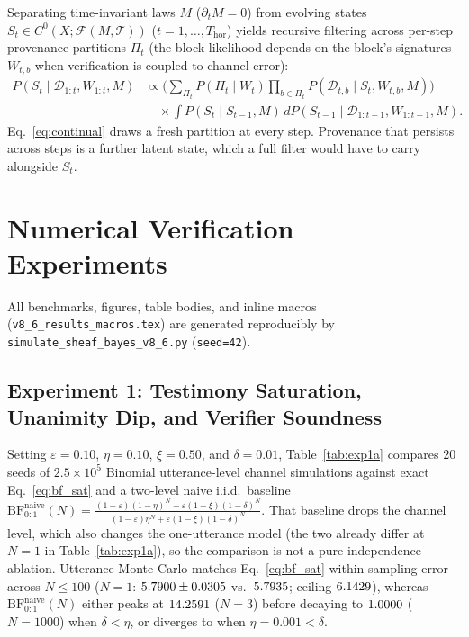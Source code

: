 \documentclass[11pt,a4paper]{article}
\theoremstyle{definition}
\theoremstyle{remark}
\newcommand{\BF}{\mathrm{BF}}
\begin{document}
Separating time-invariant laws $M$ ($\partial_t M = 0$) from evolving states $S_t \in C^0(X;\mathcal{F}(M, \mathcal{T}))$ ($t = 1, \dots, T_{\mathrm{hor}}$) \cite{lopezpaz2026against,pezeshki2024discovering} yields recursive filtering across per-step provenance partitions $\Pi_t$ (the block likelihood depends on the block's signatures $W_{t,b}$ when verification is coupled to channel error):
\begin{equation}
  \begin{aligned}
    P(S_t \mid \mathcal{D}_{1:t}, W_{1:t}, M)
    &\propto \Bigg( \sum_{\Pi_t} P(\Pi_t \mid W_t) \prod_{b \in \Pi_t} P(\mathcal{D}_{t,b} \mid S_t, W_{t,b}, M) \Bigg) \\
    &\quad \times \int P(S_t \mid S_{t-1}, M) \, dP(S_{t-1} \mid \mathcal{D}_{1:t-1}, W_{1:t-1}, M).
  \end{aligned}
  \label{eq:continual}
\end{equation}
Eq.~\eqref{eq:continual} draws a fresh partition at every step. Provenance that persists across steps is a further latent state, which a full filter would have to carry alongside $S_t$.

\section{Numerical Verification Experiments}
\label{sec:experiments}

All benchmarks, figures, table bodies, and inline macros (\texttt{v8\_6\_results\_macros.tex}) are generated reproducibly by \texttt{simulate\_sheaf\_bayes\_v8\_6.py} (\texttt{seed=42}).

\subsection{Experiment 1: Testimony Saturation, Unanimity Dip, and Verifier Soundness}
\label{sec:exp1}

Setting $\varepsilon = 0.10$, $\eta = 0.10$, $\xi = 0.50$, and $\delta = 0.01$, Table~\ref{tab:exp1a} compares $20$ seeds of $2.5 \times 10^5$ Binomial utterance-level channel simulations against exact Eq.~\eqref{eq:bf_sat} and a two-level naive i.i.d.\ baseline $\BF_{0:1}^{\mathrm{naive}}(N) = \frac{(1-\varepsilon)(1-\eta)^N + \varepsilon(1-\xi)(1-\delta)^N}{(1-\varepsilon)\eta^N + \varepsilon(1-\xi)(1-\delta)^N}$. That baseline drops the channel level, which also changes the one-utterance model (the two already differ at $N = 1$ in Table~\ref{tab:exp1a}), so the comparison is not a pure independence ablation. Utterance Monte Carlo matches Eq.~\eqref{eq:bf_sat} within sampling error across $N \le 100$ ($N=1$: $5.7900 \pm 0.0305$ vs.\ $5.7935$; ceiling $6.1429$), whereas $\BF_{0:1}^{\mathrm{naive}}(N)$ either peaks at $14.2591$ ($N=3$) before decaying to $1.0000$ ($N=1000$) when $\delta < \eta$, or diverges to \resNaiveDivOneThou{} when $\eta = 0.001 < \delta$.
\end{document}
